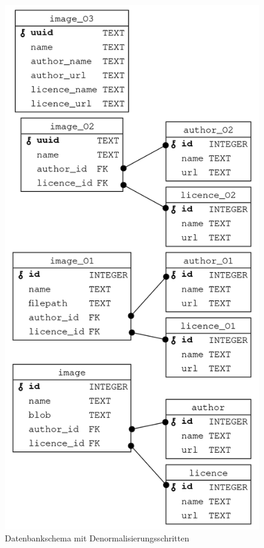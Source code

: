 \begin{figure}
  \centering
  \includegraphics[height=0.95\textheight]{images/image_database_schemas.png}
  \caption{Datenbankschema mit Denormalisierungsschritten}
  \label{fig:database-schema-optimization}
\end{figure}

